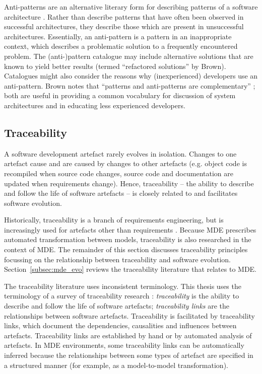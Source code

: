 Anti-patterns are an alternative literary form for describing patterns of a software architecture \cite{brown98antipatterns}. Rather than describe patterns that have often been observed in successful architectures, they describe those which are present in unsuccessful architectures. Essentially, an anti-pattern is a pattern in an inappropriate context, which describes a problematic solution to a frequently encountered problem. The (anti-)pattern catalogue may include alternative solutions that are known to yield better results (termed ``refactored solutions'' by Brown). Catalogues might also consider the reasons why (inexperienced) developers use an anti-pattern. Brown notes that ``patterns and anti-patterns are complementary'' \cite[pg. 13]{brown98antipatterns}; both are useful in providing a common vocabulary for discussion of system architectures and in educating less experienced developers.


\subsection{Traceability}
\label{subsec:traceability}
A software development artefact rarely evolves in isolation. Changes to one artefact cause and are caused by changes to other artefacts (e.g. object code is recompiled when source code changes, source code and documentation are updated when requirements change). Hence, traceability -- the ability to describe and follow the life of software artefacts \cite{winkler09survey,lago09scoped} -- is closely related to and facilitates software evolution.

Historically, traceability is a branch of requirements engineering, but is increasingly used for artefacts other than requirements \cite{winkler09survey}. Because MDE prescribes automated transformation between models, traceability is also researched in the context of MDE. The remainder of this section discusses traceability principles focussing on the relationship between traceability and software evolution. Section~\ref{subsec:mde_evo} reviews the traceability literature that relates to MDE.

The traceability literature uses inconsistent terminology. This thesis uses the terminology of a survey of traceability research \cite{winkler09survey}: \emph{traceability} is the ability to describe and follow the life of software artefacts; \emph{traceability links} are the relationships between software artefacts. Traceability is facilitated by traceability links, which document the dependencies, causalities and influences between artefacts. Traceability links are established by hand or by automated analysis of artefacts. In MDE environments, some traceability links can be automatically inferred because the relationships between some types of artefact are specified in a structured manner (for example, as a model-to-model transformation).

